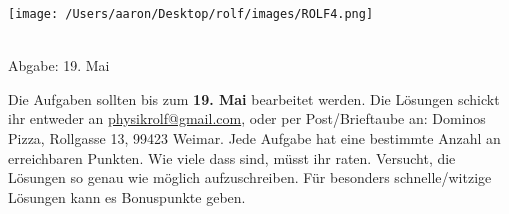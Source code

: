 \documentclass[a4paper]{article}
\numberwithin{equation}{Exercise}
\begin{document}
	\vspace*{-2cm}
	\parbox{4cm}{\texttt{[image: /Users/aaron/Desktop/rolf/images/ROLF4.png]}}
	\parbox{10.6cm}{ \\ Abgabe: 19. Mai \\ \vspace*{-.5cm} }
	
	

\thispagestyle{empty}
\begin{framed}
	\noindent
	\scriptsize
	Die Aufgaben sollten bis zum \textbf{19. Mai} bearbeitet werden. Die Lösungen schickt ihr entweder an \href{mailto:physikrolf@gmail.com}{physikrolf@gmail.com}, oder per Post/Brieftaube an: Dominos Pizza, Rollgasse 13, 99423 Weimar.
	Jede Aufgabe hat eine bestimmte Anzahl an erreichbaren Punkten. Wie viele dass sind, müsst ihr raten. Versucht, die Lösungen so genau wie möglich aufzuschreiben. Für besonders schnelle/witzige Lösungen kann es Bonuspunkte geben.
\end{framed}

\noindent




\end{document}
